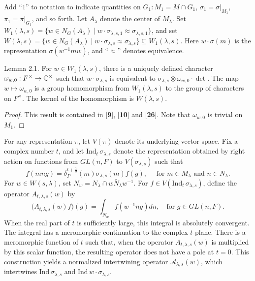 \documentclass{amsart}
\begin{document}
Add ``$1$'' to notation to indicate quantities on 
  $ G_1 : M_1 = M \cap G_1$,
  $ \sigma_1 = \sigma \big|_{M_1} $,
  $ \pi_1 = \pi \big|_{G_1} $, and so forth.
Let $A_\lambda$ denote the center of $M_\lambda$.
Set
  $ W_1 (\lambda,s) =
    \{ w \in N_G(A_{\lambda}) \mid
       w \cdot \sigma_{\lambda,s,1} \approx
       \sigma_{\lambda,s,1} 
    \} $,
and set
  $ W(\lambda,s) =
   \{ w \in N_G(A_{\lambda}) \mid
       w \cdot \sigma_{\lambda,s} \approx
       \sigma_{\lambda,s} 
    \} \subseteq W_1(\lambda,s) $.
Here
  $ w \cdot \sigma (m)$ is the representation  $ \sigma(w^{-1} mw) $,
  and ``$\approx$'' denotes equivalence.

\proclaim Lemma {2.1}.
For
  $ w \in W_1(\lambda,s) $,
there is a uniquely defined character
  $ \omega_{w,0}: F^{\times} \to {\Bbb C}^{\times} $
such that
  $ w \cdot \sigma_{\lambda,s} $ is equivalent to
   $\sigma_{\lambda,s} \otimes
   \omega_{w,0} \cdot \det $.
The map
  $ w \mapsto \omega_{w,0} $
is a group homomorphism from 
  $ W_1(\lambda,s) $
to the group of characters on 
  $ F^{\times} $.
The kernel of the homomorphism is
  $ W(\lambda,s) $.
\finishproclaim

\begin{proof}
This result is contained in {\rm [{\bf 9}], [{\bf 10}] and [{\bf 26}]}.
Note that
  $ \omega_{w,0} $
is trivial on
  $ M_1 $.
\end{proof}

For any representation
  $ \pi $,
let
  $ V(\pi)$
denote its underlying vector space.
Fix a complex number $t$, and let
  $ \text{Ind}_t \, \sigma_{\lambda,s} $
denote the representation obtained by right action on
functions from
  $ GL(n,F) $
to 
  $ V(\sigma_{\lambda,s}) $
such that%
$$
  f(mng) =
  \delta_P^{t+\frac12} (m)
  \sigma_{\lambda,s} (m) f(g),
  \quad\text { for }
  m \in M_{\lambda} \text{ and }n \in N_{\lambda}.
$$
%
For 
  $ w \in W(s,\lambda) $,
set
  $ N_w = N_\lambda \cap w \bar N_\lambda w^{-1} $.
For 
  $ f \in  V
    (\text{Ind}_t \, \sigma_{\lambda,s}) $,
define the operator
  $ A_{t,\lambda,s} (w) $
by
%
$$
  \bigl(
    A_{t,\lambda,s} (w) f
  \bigr)
  (g) =
  \int_{N_w}
  f (w^{-1} ng) dn, 
  \quad 
  \text{for }g \in GL(n,F).
$$
%
When the real part of $t$ is sufficiently large,
this integral is absolutely convergent.  The integral has a meromorphic
continuation to the complex $t$-plane.
There is a meromorphic function of $t$ such that, when
  the operator $ A_{t,\lambda,s} (w) $
is multiplied by this scalar function, the resulting operator does not have
a pole at
  $ t = 0 $. 
This construction yields a normalized intertwining operator
  $ {\mathcal A}_{\lambda,s} (w) $,
which intertwines
  $ \text{Ind} \, \sigma_{\lambda,s} $
and
  $ \text{Ind} \, w \cdot \sigma_{\lambda, s}  $.
\end{document}
